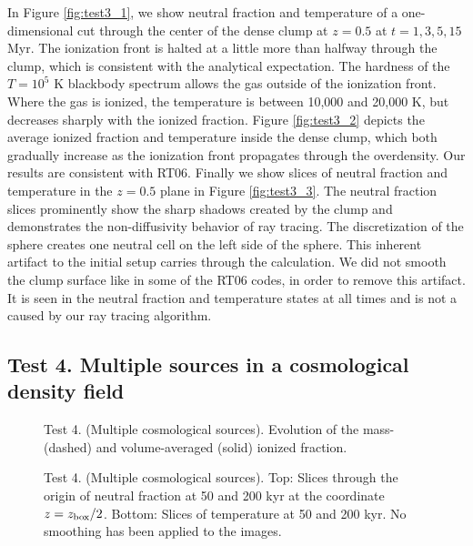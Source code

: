 \documentclass[apj,onecolumn]{emulateapj}
\begin{document}
In Figure \ref{fig:test3_1}, we show neutral fraction and temperature
of a one-dimensional cut through the center of the dense clump at $z =
0.5$ at $t = 1, 3, 5, 15$ Myr.  The ionization front is halted at a
little more than halfway through the clump, which is consistent with
the analytical expectation.  The hardness of the $T = 10^5$ K
blackbody spectrum allows the gas outside of the ionization front.
Where the gas is ionized, the temperature is between 10,000 and 20,000
K, but decreases sharply with the ionized fraction.  Figure
\ref{fig:test3_2} depicts the average ionized fraction and temperature
inside the dense clump, which both gradually increase as the
ionization front propagates through the overdensity.  Our results are
consistent with RT06.  Finally we show slices of neutral fraction and
temperature in the $z = 0.5$ plane in Figure \ref{fig:test3_3}.  The
neutral fraction slices prominently show the sharp shadows created by
the clump and demonstrates the non-diffusivity behavior of ray
tracing.  The discretization of the sphere creates one neutral cell on
the left side of the sphere.  This inherent artifact to the initial
setup carries through the calculation.  We did not smooth the clump
surface like in some of the RT06 codes, in order to remove this
artifact.  It is seen in the neutral fraction and temperature states
at all times and is not a caused by our ray tracing algorithm.

\subsection{Test 4. Multiple sources in a cosmological density field}

\begin{figure}[t]
  \caption{\label{fig:test4_1} Test 4. (Multiple cosmological
    sources).  Evolution of the mass- (dashed) and volume-averaged
    (solid) ionized fraction.}
\end{figure}

\begin{figure}[t]
  \caption{\label{fig:test4_2} Test 4. (Multiple cosmological
    sources).  Top: Slices through the origin of neutral fraction at
    50 and 200 kyr at the coordinate $z = z_{\rm box}/2$.  Bottom:
    Slices of temperature at 50 and 200 kyr.  No smoothing has been
    applied to the images.}
\end{figure}
\end{document}
